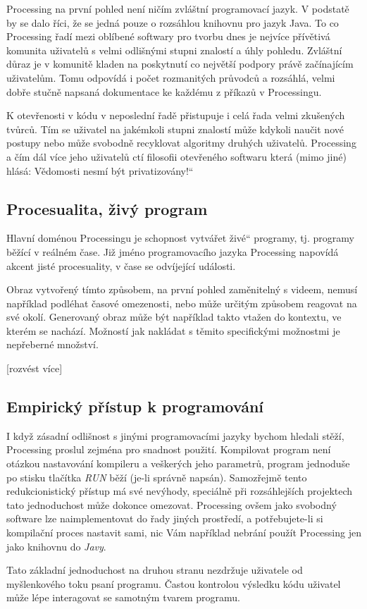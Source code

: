 \documentclass[12pt,twopage]{book}
\renewcommand\uv[1]{\quotedblbase #1\textquotedblleft}%
\newcommand{\pododdil}[1]{\subsection{#1}\label{subsec:#1}}
\begin{document}
Processing na první pohled není ničím zvláštní programovací jazyk. V podstatě by se dalo říci, že se jedná pouze o rozsáhlou knihovnu pro jazyk Java. To co Processing řadí mezi oblíbené softwary pro tvorbu dnes je nejvíce přívětivá komunita uživatelů s velmi odlišnými stupni znalostí a úhly pohledu. Zvláštní důraz je v komunitě kladen na poskytnutí co největší podpory právě začínajícím uživatelům. Tomu odpovídá i počet rozmanitých průvodců a rozsáhlá, velmi dobře stučně napsaná dokumentace ke každému z příkazů v Processingu.

K otevřenosti v kódu v neposlední řadě přistupuje i celá řada velmi zkušených tvůrců. Tím se uživatel na jakémkoli stupni znalostí může kdykoli naučit nové postupy nebo může svobodně recyklovat algoritmy druhých uživatelů. Processing a čím dál více jeho uživatelů ctí filosofii otevřeného softwaru která (mimo jiné) hlásá: \uv{Vědomosti nesmí být privatizovány!}

\pododdil{Procesualita, živý program}

Hlavní doménou Processingu je schopnost vytvářet \uv{živé} programy, tj. programy běžící v reálném čase. Již jméno programovacího jazyka Processing napovídá akcent jisté procesuality, v čase se odvíjející události.

Obraz vytvořený tímto způsobem, na první pohled zaměnitelný s videem, nemusí například podléhat časové omezenosti, nebo může určitým způsobem reagovat na své okolí. Generovaný obraz může být například takto vtažen do kontextu, ve kterém se nachází. Možností jak nakládat s těmito specifickými možnostmi je nepřeberné množství.

[rozvést více]

\pododdil{Empirický přístup k programování}

	I když zásadní odlišnost s jinými programovacími jazyky bychom hledali stěží, Processing proslul zejména pro snadnost použití. Kompilovat program není otázkou nastavování kompileru a veškerých jeho parametrů, program jednoduše po stisku tlačítka {\em RUN} běží (je-li správně napsán). Samozřejmě tento redukcionistický přístup má své nevýhody, speciálně při rozsáhlejších projektech tato jednoduchost může dokonce omezovat. Processing ovšem jako svobodný software lze naimplementovat do řady jiných prostředí, a potřebujete-li si kompilační proces nastavit sami, nic Vám například nebrání použít Processing jen jako knihovnu do {\em Javy}.

Tato základní jednoduchost na druhou stranu nezdržuje uživatele od myšlenkového toku psaní programu. Častou kontrolou výsledku kódu uživatel může lépe interagovat se samotným tvarem programu.
\end{document}

